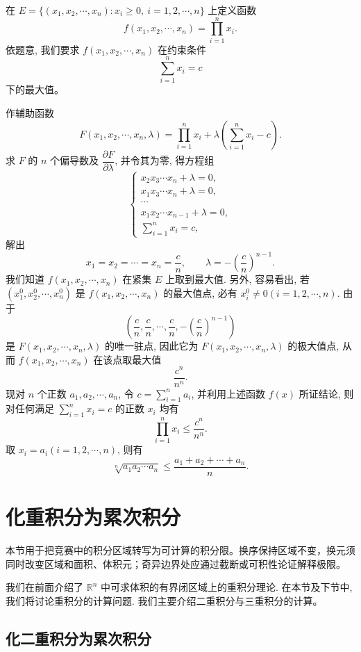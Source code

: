 \documentclass[UTF8,12pt,a4paper,fontset=fandol]{ctexart}
\begin{document}
\begin{solve}\quad 在 $E=\{(x_1,x_2,\cdots,x_n):x_i\geqslant0,\ i=1,2,\cdots,n\}$ 上定义函数
\[
  f(x_1,x_2,\cdots,x_n)=\prod_{i=1}^n x_i.
\]
依题意, 我们要求 $f(x_1,x_2,\cdots,x_n)$ 在约束条件
\[
  \sum_{i=1}^n x_i=c
\]
下的最大值。

作辅助函数
\[
  F(x_1,x_2,\cdots,x_n,\lambda)
  =
  \prod_{i=1}^n x_i
  +\lambda\left(\sum_{i=1}^n x_i-c\right).
\]
求 $F$ 的 $n$ 个偏导数及 $\dfrac{\partial F}{\partial\lambda}$, 并令其为零, 得方程组
\[
  \begin{cases}
    x_2x_3\cdots x_n+\lambda=0,\\
    x_1x_3\cdots x_n+\lambda=0,\\
    \cdots\\
    x_1x_2\cdots x_{n-1}+\lambda=0,\\
    \displaystyle\sum_{i=1}^n x_i=c,
  \end{cases}
\]
解出
\[
  x_1=x_2=\cdots=x_n=\frac cn,\qquad
  \lambda=-\left(\frac cn\right)^{n-1}.
\]
我们知道 $f(x_1,x_2,\cdots,x_n)$ 在紧集 $E$ 上取到最大值. 另外, 容易看出, 若 $(x_1^0,x_2^0,\cdots,x_n^0)$ 是 $f(x_1,x_2,\cdots,x_n)$ 的最大值点, 必有 $x_i^0\ne0(i=1,2,\cdots,n)$. 由于
\[
  \left(\frac cn,\frac cn,\cdots,\frac cn,-\left(\frac cn\right)^{n-1}\right)
\]
是 $F(x_1,x_2,\cdots,x_n,\lambda)$ 的唯一驻点, 因此它为 $F(x_1,x_2,\cdots,x_n,\lambda)$ 的极大值点, 从而 $f(x_1,x_2,\cdots,x_n)$ 在该点取最大值
\[
  \frac{c^n}{n^n}.
\]
现对 $n$ 个正数 $a_1,a_2,\cdots,a_n$, 令 $c=\displaystyle\sum_{i=1}^n a_i$, 并利用上述函数 $f(x)$ 所证结论, 则对任何满足 $\displaystyle\sum_{i=1}^n x_i=c$ 的正数 $x_i$ 均有
\[
  \prod_{i=1}^n x_i\leqslant\frac{c^n}{n^n}.
\]
取 $x_i=a_i(i=1,2,\cdots,n)$, 则有
\[
  \sqrt[n]{a_1a_2\cdots a_n}
  \leqslant
  \frac{a_1+a_2+\cdots+a_n}{n}.
\]

\end{solve}


\section{化重积分为累次积分}\label{course-15-3}
本节用于把竞赛中的积分区域转写为可计算的积分限。换序保持区域不变，换元须同时改变区域和面积、体积元；奇异边界处应通过截断或可积性论证解释极限。

我们在前面介绍了 $\mathbb R^n$ 中可求体积的有界闭区域上的重积分理论. 在本节及下节中, 我们将讨论重积分的计算问题. 我们主要介绍二重积分与三重积分的计算。

\subsection{化二重积分为累次积分}
\end{document}
